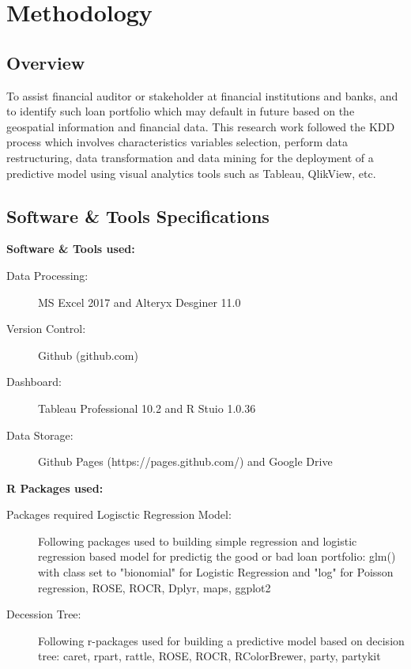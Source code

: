 %
%
%
%

\chapter{Methodology}\label{C.Methodology}

\section{Overview}\label{S.Ch4.opening}
To assist financial auditor or stakeholder at financial institutions and banks, and to identify such loan portfolio which may default in future based on the geospatial information and financial data. This research work followed the KDD process which involves characteristics variables selection, perform data restructuring, data transformation and data mining for the deployment of a predictive model using visual analytics tools such as Tableau, QlikView, etc.


\section{Software \& Tools Specifications}\label{ch4.2}

\textbf{Software \& Tools used:}

\begin{description}
  \item[Data Processing:] MS Excel 2017 and Alteryx Desginer 11.0
  \item[Version Control:] Github (github.com)
  \item[Dashboard:] Tableau Professional 10.2 and R Stuio 1.0.36
  \item[Data Storage:] Github Pages (https://pages.github.com/) and Google Drive
\end{description}

\textbf{R Packages used:}\\

\begin{description}
  \item[Packages required Logisctic Regression Model:] Following packages used to building simple regression and logistic regression based model for predictig the good or bad loan portfolio: glm() with class set to "bionomial" for Logistic Regression and "log" for Poisson regression, ROSE, ROCR, Dplyr, maps, ggplot2
  \item[Decession Tree:] Following r-packages used for building a predictive model based on decision tree: caret, rpart, rattle, ROSE, ROCR, RColorBrewer, party, partykit

\end{description}

